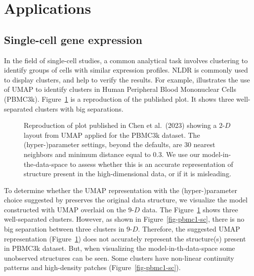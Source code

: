 \documentclass[
  12pt]{article}
\begin{document}
\section{Applications}\label{sec-applications}

\subsection{Single-cell gene
expression}\label{single-cell-gene-expression}

In the field of single-cell studies, a common analytical task involves
clustering to identify groups of cells with similar expression profiles.
NLDR is commonly used to display clusters, and help to verify the
results. For example, \citet{chen2023} illustrates the use of UMAP to
identify clusters in Human Peripheral Blood Mononuclear Cells (PBMC3k).
Figure~\ref{fig-umap-author} is a reproduction of the published plot. It
shows three well-separated clusters with big separations.

\begin{figure}[H]


\caption{\label{fig-umap-author}Reproduction of plot published in Chen
et al.~(2023) showing a \(2\text{-}D\) layout from UMAP applied for the
PBMC3k dataset. The (hyper-)parameter settings, beyond the defaults, are
30 nearest neighbors and minimum distance equal to 0.3. We use our
model-in-the-data-space to assess whether this is an accurate
representation of structure present in the high-dimensional data, or if
it is misleading.}

\end{figure}%

To determine whether the UMAP representation with the (hyper-)parameter
choice suggested by \citet{chen2023} preserves the original data
structure, we visualize the model constructed with UMAP overlaid on the
\(9\text{-}D\) data. The Figure~\ref{fig-umap-author} shows three
well-separated clusters. However, as shown in Figure~\ref{fig-pbmc1-sc},
there is no big separation between three clusters in \(9\text{-}D\).
Therefore, the suggested UMAP representation
(Figure~\ref{fig-umap-author}) does not accurately represent the
structure(s) present in PBMC3k dataset. But, when visualizing the
model-in-th-data-space some unobserved structures can be seen. Some
clusters have non-linear continuity patterns and high-density patches
(Figure~\ref{fig-pbmc1-sc}).
\end{document}
